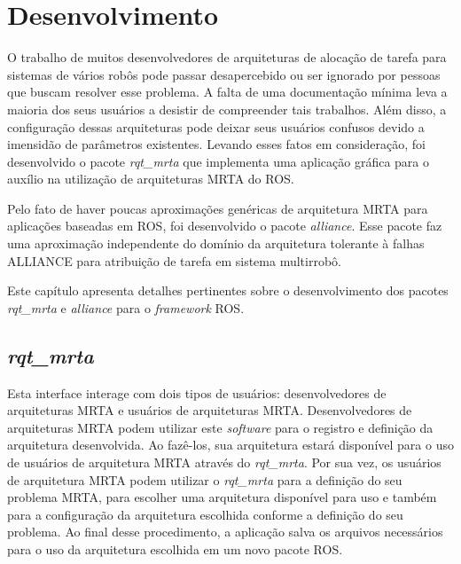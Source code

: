 \chapter[Desenvolvimento]{Desenvolvimento} \label{cap:desenvolvimento}
    O trabalho de muitos desenvolvedores de arquiteturas de alocação de tarefa para sistemas de vários robôs pode passar desapercebido ou ser ignorado por pessoas que buscam resolver esse problema. A falta de uma documentação mínima leva a maioria dos seus usuários a desistir de compreender tais trabalhos. Além disso, a configuração dessas arquiteturas pode deixar seus usuários confusos devido a imensidão de parâmetros existentes. Levando esses fatos em consideração, foi desenvolvido o pacote \textit{rqt\_mrta} que implementa uma aplicação gráfica para o auxílio na utilização de arquiteturas MRTA do ROS.
    
    Pelo fato de haver poucas aproximações genéricas de arquitetura MRTA para aplicações baseadas em ROS, foi desenvolvido o pacote \textit{alliance}. Esse pacote faz uma aproximação independente do domínio da arquitetura tolerante à falhas ALLIANCE \cite{ref:parker1998alliance} para atribuição de tarefa em sistema multirrobô. 
        
    Este capítulo apresenta detalhes pertinentes sobre o desenvolvimento dos pacotes \textit{rqt\_mrta} e \textit{alliance} para o \textit{framework} ROS.
    
    
    \section{\textit{rqt\_mrta}}
        Esta interface interage com dois tipos de usuários: desenvolvedores de arquiteturas MRTA e usuários de arquiteturas MRTA. Desenvolvedores de arquiteturas MRTA podem utilizar este \textit{software} para o registro e definição da arquitetura desenvolvida. Ao fazê-los, sua arquitetura estará disponível para o uso de usuários de arquitetura MRTA através do \textit{rqt\_mrta}. Por sua vez, os usuários de arquitetura MRTA podem utilizar o \textit{rqt\_mrta} para a definição do seu problema MRTA, para escolher uma arquitetura disponível para uso e também para a configuração da arquitetura escolhida conforme a definição do seu problema. Ao final desse procedimento, a aplicação salva os arquivos necessários para o uso da arquitetura escolhida em um novo pacote ROS.
        
